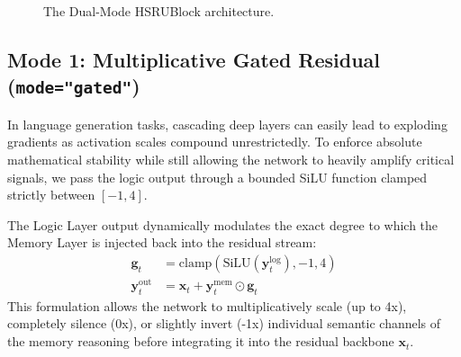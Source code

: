\documentclass[11pt,a4paper]{article}
\begin{document}
\begin{figure}[h]
{
    }
    \caption{The Dual-Mode HSRUBlock architecture.}
\end{figure}

\subsection{Mode 1: Multiplicative Gated Residual (\texttt{mode="gated"})}
In language generation tasks, cascading deep layers can easily lead to exploding gradients as activation scales compound unrestrictedly. To enforce absolute mathematical stability while still allowing the network to heavily amplify critical signals, we pass the logic output through a bounded SiLU function clamped strictly between $[-1, 4]$.

The Logic Layer output dynamically modulates the exact degree to which the Memory Layer is injected back into the residual stream:
\begin{align}
    \mathbf{g}_t &= \text{clamp}\left( \text{SiLU}(\mathbf{y}_t^{\text{log}}), -1, 4 \right) \\
    \mathbf{y}_t^{\text{out}} &= \mathbf{x}_t + \mathbf{y}_t^{\text{mem}} \odot \mathbf{g}_t
\end{align}
This formulation allows the network to multiplicatively scale (up to 4x), completely silence (0x), or slightly invert (-1x) individual semantic channels of the memory reasoning before integrating it into the residual backbone $\mathbf{x}_t$.
\end{document}
